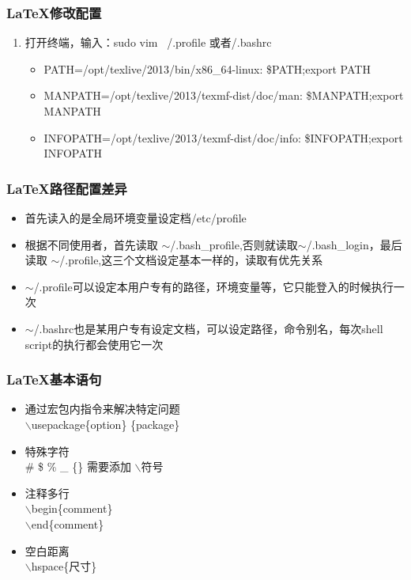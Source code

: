 \documentclass[notheorems,mathserif,table,compress]{beamer}  %
\begin{document}
\begin{frame}
  \frametitle{\LaTeX{}修改配置}
  \begin{enumerate}
  \item 打开终端，输入：sudo vim ~/.profile 或者/.bashrc
    \begin{itemize}        
    \item PATH=/opt/texlive/2013/bin/x86\_64-linux: \$PATH;export PATH
    \item MANPATH=/opt/texlive/2013/texmf-dist/doc/man: \$MANPATH;export MANPATH
    \item INFOPATH=/opt/texlive/2013/texmf-dist/doc/info: \$INFOPATH;export INFOPATH
    \end{itemize}
  \end{enumerate}
\end{frame}

\begin{frame}
  \frametitle{\LaTeX{}路径配置差异}
    \begin{itemize}        
    \item 首先读入的是全局环境变量设定档/etc/profile
    \item 根据不同使用者，首先读取 $\sim$/.bash\_profile,否则就读取$\sim$/.bash\_login，最后读取 $\sim$/.profile,这三个文档设定基本一样的，读取有优先关系
    \item $\sim$/.profile可以设定本用户专有的路径，环境变量等，它只能登入的时候执行一次
    \item $\sim$/.bashrc也是某用户专有设定文档，可以设定路径，命令别名，每次shell script的执行都会使用它一次
    \end{itemize}
\end{frame}

\begin{frame}
  \frametitle{\LaTeX{}基本语句}
  \begin{itemize}
  \item 通过宏包内指令来解决特定问题\\
     \hspace{0.5in}   $\backslash$usepackage\{option\} \{package\}
  \item 特殊字符\\
    \hspace{0.5in}\# \$ \% \_ \{\}   需要添加 $\backslash$符号
  \item 注释多行 \\
    \hspace{0.5in}   $\backslash$begin\{comment\}  \\
    \hspace{0.5in}   $\backslash$end\{comment\}
  \item  空白距离\\
    \hspace{0.5in}   $\backslash$hspace\{尺寸\} 
  \end{itemize}
\end{frame}
\end{document}
